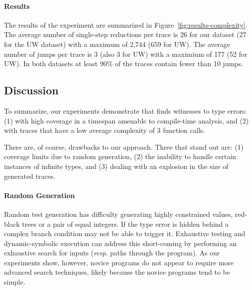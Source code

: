 \paragraph{Results}
\label{sec:results-complexity}
The results of the experiment are summarized in
Figure~\ref{fig:results-complexity}.
%
The average number of single-step reductions per trace is 26 for our
dataset (27 for the UW dataset) with a maximum of 2,744 (659 for
UW). The average number of jumps per trace is 3 (also 3 for
UW) with a maximium of 177 (52 for UW). In both datasets at
least 90\% of the traces contain fewer than 10 jumps.
%

\subsection{Discussion}
\label{sec:discussion}
To summarize, our experiments demonstrate that \nanomaly finds witnesses
to type errors: (1) with high coverage in a timespan amenable to
compile-time analysis, and (2) with traces that have a low average
complexity of 3 function calls.

There are, of course, drawbacks to our approach. Three that stand out
are: (1) coverage limits due to random generation, (2) the inability to
handle certain instances of infinite types, and (3) dealing with an
explosion in the size of generated traces.

\paragraph{Random Generation}
Random test generation has difficulty generating highly constrained
values, \eg red-black trees or a pair of equal integers. If the type
error is hidden behind a complex branch condition \nanomaly may not be
able to trigger it. Exhaustive testing and dynamic-symbolic execution
can address this short-coming by performing an exhaustive search for
inputs (\emph{resp}. paths through the program). As our experiments
show, however, novice programs do not appear to require more advanced
search techniques, likely because the novice programs tend to be simple.

